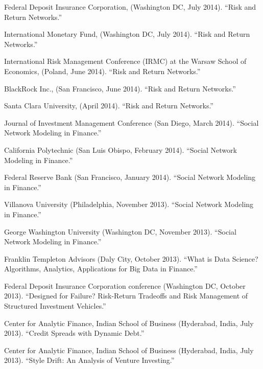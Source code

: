 \documentclass{article}
\begin{document}
\begin{etaremune}
{\item Federal Deposit Insurance Corporation, (Washington DC, July 2014). ``Risk and Return Networks.''

\item International Monetary Fund, (Washington DC, July 2014). ``Risk and Return Networks.''

\item International Risk Management Conference (IRMC) at the Warsaw School of Economics, (Poland, June 2014). ``Risk and Return Networks.''

\item BlackRock Inc., (San Francisco, June 2014). ``Risk and Return Networks.''

\item Santa Clara University, (April 2014). ``Risk and Return Networks.'' 

\item Journal of Investment Management Conference (San Diego, March 2014). ``Social Network Modeling in Finance.'' 

\item California Polytechnic (San Luis Obispo, February 2014). ``Social Network Modeling in Finance.'' 

\item Federal Reserve Bank (San Francisco, January 2014). ``Social Network Modeling in Finance.'' 

\item Villanova University (Philadelphia, November 2013). ``Social Network Modeling in Finance.'' 

\item George Washington University (Washington DC, November 2013). ``Social Network Modeling in Finance.'' 

\item Franklin Templeton Advisors (Daly City, October 2013). ``What is Data Science? Algorithms, Analytics, Applications for Big Data in Finance.'' 

\item Federal Deposit Insurance Corporation conference (Washington DC, October 2013). ``Designed for Failure? Risk-Return Tradeoffs and Risk Management of Structured Investment Vehicles.''

\item Center for Analytic Finance, Indian School of Business (Hyderabad, India, July 2013). ``Credit Spreads with Dynamic Debt.''

\item Center for Analytic Finance, Indian School of Business (Hyderabad, India, July 2013). ``Style Drift: An Analysis of Venture Investing.''

}
\end{etaremune}
\end{document}
